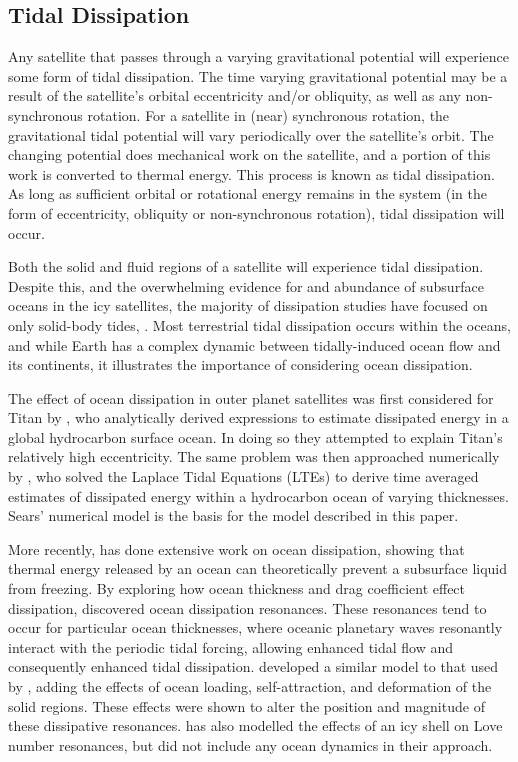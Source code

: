 \subsection{Tidal Dissipation}

Any satellite that passes through a varying gravitational potential will experience some form of tidal dissipation. The time varying gravitational potential may be a result of the satellite's orbital eccentricity and/or obliquity, as well as any non-synchronous rotation. For a satellite in (near) synchronous rotation, the gravitational tidal potential will vary periodically over the satellite's orbit. The changing potential does mechanical work on the satellite, and a portion of this work is converted to thermal energy. This process is known as tidal dissipation. As long as sufficient orbital or rotational energy remains in the system (in the form of eccentricity, obliquity or non-synchronous rotation), tidal dissipation will occur.

Both the solid and fluid regions of a satellite will experience tidal dissipation. Despite this, and the overwhelming evidence for and abundance of subsurface oceans in the icy satellites, the majority of dissipation studies have focused on only solid-body tides, \citep[e.g.,][]{moore2000tidal, tobie2005tidal,roberts2008tidal, beuthe2013spatial}.
Most terrestrial tidal dissipation occurs within the oceans, and while Earth has a complex dynamic between tidally-induced ocean flow and its continents, it illustrates the importance of considering ocean dissipation.

The effect of ocean dissipation in outer planet satellites was first considered for Titan by \citet{sagan1982tide}, who analytically derived expressions to estimate dissipated energy in a global hydrocarbon surface ocean. In doing so they attempted to explain Titan's relatively high eccentricity. The same problem was then approached numerically by \citet{sears1995tidal}, who solved the Laplace Tidal Equations (LTEs) to derive time averaged estimates of dissipated energy within a hydrocarbon ocean of varying thicknesses. Sears' numerical model is the basis for the model described in this paper.

More recently, \citet{tyler2008strong,tyler2009ocean,tyler2011tidal,tyler2014comparative} has done extensive work on ocean dissipation, showing that thermal energy released by an ocean can theoretically prevent a subsurface liquid from freezing. By exploring how ocean thickness and drag coefficient effect dissipation, \citet{tyler2011tidal} discovered ocean dissipation resonances. These resonances tend to occur for particular ocean thicknesses, where oceanic planetary waves resonantly interact with the periodic tidal forcing, allowing enhanced tidal flow and consequently enhanced tidal dissipation. \citet{matsuyama2014tidal} developed a similar model to that used by \citet{tyler2011tidal}, adding the effects of ocean loading, self-attraction, and deformation of the solid regions. These effects were shown to alter the position and magnitude of these dissipative resonances. \citet{kamata2015tidal} has also modelled the effects of an icy shell on Love number resonances, but did not include any ocean dynamics in their approach.

